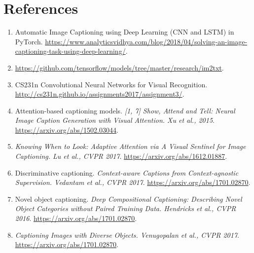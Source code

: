 \documentclass[english]{article}
\begin{document}
\section{References}
\begin{enumerate}
    \item Automatic Image Captioning using Deep Learning (CNN and LSTM) in PyTorch. \url{https://www.analyticsvidhya.com/blog/2018/04/solving-an-image-captioning-task-using-deep-learning/}.
    \item \url{https://github.com/tensorflow/models/tree/master/research/im2txt}.
    \item CS231n Convolutional Neural Networks for Visual Recognition. \url{http://cs231n.github.io/assignments2017/assignment3/}.
    \item Attention-based captioning models. \textit{[1, 7] Show, Attend and Tell: Neural Image Caption Generation with Visual Attention. Xu et al., 2015}. \url{https://arxiv.org/abs/1502.03044}.
\item \textit{Knowing When to Look: Adaptive Attention via A Visual Sentinel for Image Captioning. Lu et al., CVPR 2017}. \url{https://arxiv.org/abs/1612.01887}.
\item Discriminative captioning. \textit{Context-aware Captions from Context-agnostic Supervision. Vedantam et al., CVPR 2017}. \url{https://arxiv.org/abs/1701.02870}.
\item Novel object captioning. \textit{Deep Compositional Captioning: Describing Novel Object Categories without Paired Training Data. Hendricks et al., CVPR 2016}. \url{https://arxiv.org/abs/1701.02870}.
\item \textit{Captioning Images with Diverse Objects. Venugopalan et al., CVPR 2017}. \url{https://arxiv.org/abs/1701.02870}.
    \end{enumerate}
\end{document}
